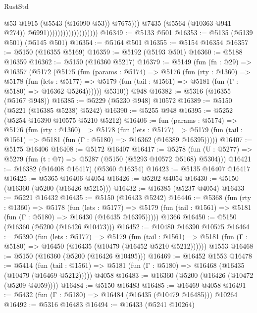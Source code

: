 \begin{lexlean}{RustStd}
\begin{coremodule}
                                                @53
                                                @1915
                                                (@5543 (@16090 @53))
                                                @7675)))
                                          @7435
                                          (@5564 (@10363 @941 @274))
                                          @6991)))))))))))))))))))
@16349 := @5133 @501
@16353 := @5135 (@5139 @501) (@5145 @501)
@16354 := @5164 @501
@16355 := @5154 @16354
@16357 := @5150 (@16355 @5169)
@16359 := @5192 (@5193 @501)
@16360 := @5188 @16359
@16362 := @5150 (@16360 @5217)
@16379 := @5149
    (fun (fn : @29) =>
    @16357
      (@5172
        (@5175
          (fun (params : @5174) =>
          @5176
            (fun (rty : @1360) =>
            @5178
              (fun (lets : @5177) =>
              @5179 (fun (tail : @1561) => @5181 (fun (Γ : @5180) => @16362 @5264))))))
        @5310))
    @948
@16382 := @5316 (@16355 (@5167 @948))
@16385 := @5229 (@5230 @948) @10572
@16389 := @5150 (@5221 (@16385 @5238) @5242)
@16390 := @5255 @948
@16395 := @5252 (@5254 @16390 @10575 @5210 @5212)
@16406 := fun (params : @5174) =>
  @5176
    (fun (rty : @1360) =>
    @5178
      (fun (lets : @5177) =>
      @5179 (fun (tail : @1561) => @5181 (fun (Γ : @5180) => @16362 (@16389 @16395)))))
@16407 := @5175 @16406
@16408 := @5172 @16407
@16417 := @5278
    (fun (U : @5277) => @5279 (fun (t : @7) => @5287 (@5150 (@5293 @10572 @5168) @5304)))
@16421 := @16382 (@16408 @16417) (@5360 @16354)
@16423 := @5135 @16407 @16417
@16425 := @5365 @16406 @4054
@16426 := @5202 @4054
@16430 := @5150 (@16360 (@5200 (@16426 @5215)))
@16432 := @16385 (@5237 @4054)
@16433 := @5221 @16432
@16435 := @5150 (@16433 @5242)
@16446 := @5368
    (fun (rty : @1360) =>
    @5178
      (fun (lets : @5177) =>
      @5179 (fun (tail : @1561) => @5181 (fun (Γ : @5180) => @16430 (@16435 @16395)))))
    @1366
@16450 := @5150 (@16360 (@5200 (@16426 @10473)))
@16452 := @10480 @16390 @10575
@16464 := @5390
    (fun (lets : @5177) =>
    @5179
      (fun (tail : @1561) =>
      @5181 (fun (Γ : @5180) => @16450 (@16435 (@10479 (@16452 @5210 @5212))))))
    @1553
@16468 := @5150 (@16360 (@5200 (@16426 @10495)))
@16469 := @16452 @1553
@16478 := @5414
    (fun (tail : @1561) => @5181 (fun (Γ : @5180) => @16468 (@16435 (@10479 (@16469 @5212)))))
    @4058
@16483 := @16360 (@5200 (@16426 (@10472 (@5209 @4059))))
@16484 := @5150 @16483
@16485 := @16469 @4058
@16491 := @5432 (fun (Γ : @5180) => @16484 (@16435 (@10479 @16485))) @10264
@16492 := @5316 @16483
@16494 := @16433 (@5241 @10264)

\end{coremodule}
\end{lexlean}
